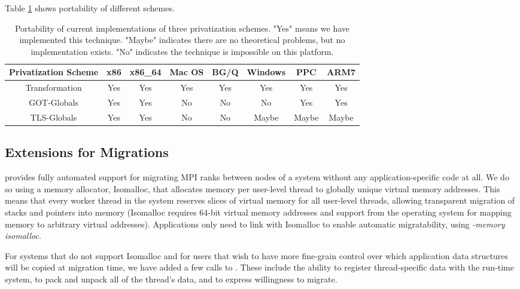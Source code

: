 \documentclass[10pt]{article}
\begin{document}
Table \ref{tab:portability} shows portability of different schemes.

\begin{table}[!tb]
\begin{center}
\begin{tabular}{|c||c|c|c|c|c|c|c|}
\hline
Privatization Scheme     & x86     & x86\_64  & Mac OS & BG/Q  & Windows & PPC   & ARM7  \\
\hline
\hline
Transformation           & Yes     & Yes     & Yes     & Yes   & Yes     & Yes   & Yes   \\
\hline
GOT-Globals              & Yes     & Yes     & No      & No    & No      & Yes   & Yes   \\
\hline
TLS-Globals              & Yes     & Yes     & No      & No    & Maybe   & Maybe & Maybe \\
\hline
\end{tabular}
\caption{Portability of current implementations of three privatization schemes.
"Yes" means we have implemented this technique.
"Maybe" indicates there are no theoretical problems, but no implementation exists.
"No" indicates the technique is impossible on this platform.}
\label{tab:portability}
\vspace{-1.0cm}
\end{center}
\end{table}
\subsection{Extensions for Migrations}

\ampi{} provides fully automated support for migrating MPI ranks between nodes of a
system without any application-specific code at all. We do so using a memory
allocator, Isomalloc, that allocates memory per user-level thread to globally
unique virtual memory addresses. This means that every worker thread in the system
reserves slices of virtual memory for all user-level threads, allowing transparent migration
of stacks and pointers into memory (Isomalloc requires 64-bit virtual memory
addresses and support from the operating system for mapping memory to arbitrary
virtual addresses). Applications only need to link with Isomalloc to enable
automatic migratability, using \emph{-memory isomalloc}.

For systems that do not support Isomalloc and for users that wish to have more
fine-grain control over which application data structures will be copied at
migration time, we have added a few calls to \ampi{}. These include
the ability to register thread-specific data with the run-time system, to pack
and unpack all of the thread's data, and to express willingness to migrate.
\end{document}
